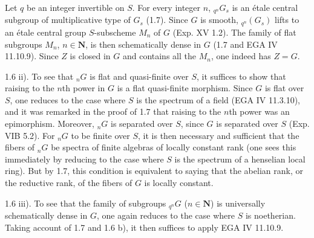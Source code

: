 Let $q$ be an integer invertible on $S$. For every integer $n$, ${}_{q^n}G_s$ is an étale central subgroup of multiplicative type of $G_s$ (1.7). Since $G$ is smooth, ${}_{q^n}(G_s)$ lifts to an étale central group $S$-subscheme $M_n$ of $G$ (Exp. XV 1.2). The family of flat subgroups $M_n$, $n\in\mathbf N$, is then schematically dense in $G$ (1.7 and EGA IV 11.10.9). Since $Z$ is closed in $G$ and contains all the $M_n$, one indeed has $Z=G$.

1.6 ii). To see that ${}_nG$ is flat and quasi-finite over $S$, it suffices to show that raising to the $n$th power in $G$ is a flat quasi-finite morphism. Since $G$ is flat over $S$, one reduces to the case where $S$ is the spectrum of a field (EGA IV 11.3.10), and it was remarked in the proof of 1.7 that raising to the $n$th power was an epimorphism. Moreover, ${}_nG$ is separated over $S$, since $G$ is separated over $S$ (Exp. VIB 5.2). For ${}_nG$ to be finite over $S$, it is then necessary and sufficient that the fibers of ${}_nG$ be spectra of finite algebras of locally constant rank (one sees this immediately by reducing to the case where $S$ is the spectrum of a henselian local ring). But by 1.7, this condition is equivalent to saying that the abelian rank, or the reductive rank, of the fibers of $G$ is locally constant.

1.6 iii). To see that the family of subgroups ${}_{q^n}G$ ($n\in\mathbf N$) is universally schematically dense in $G$, one again reduces to the case where $S$ is noetherian. Taking account of 1.7 and 1.6 b), it then suffices to apply EGA IV 11.10.9.

